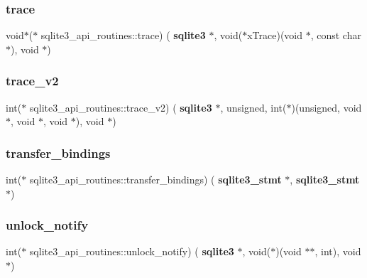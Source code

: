 \subsubsection{trace}
{\footnotesize\ttfamily void$\ast$($\ast$ sqlite3\+\_\+api\+\_\+routines\+::trace) (\textbf{ sqlite3} $\ast$, void($\ast$x\+Trace)(void $\ast$, const char $\ast$), void $\ast$)}

\mbox{\label{structsqlite3__api__routines_a1e15157983af5536336892fdc5707275}} 
\subsubsection{trace\_v2}
{\footnotesize\ttfamily int($\ast$ sqlite3\+\_\+api\+\_\+routines\+::trace\+\_\+v2) (\textbf{ sqlite3} $\ast$, unsigned, int($\ast$)(unsigned, void $\ast$, void $\ast$, void $\ast$), void $\ast$)}

\mbox{\label{structsqlite3__api__routines_ab3c5b0d61682151cd3c8419eb4c1ca13}} 
\subsubsection{transfer\_bindings}
{\footnotesize\ttfamily int($\ast$ sqlite3\+\_\+api\+\_\+routines\+::transfer\+\_\+bindings) (\textbf{ sqlite3\+\_\+stmt} $\ast$, \textbf{ sqlite3\+\_\+stmt} $\ast$)}

\mbox{\label{structsqlite3__api__routines_a600f476bdaff1340fa4fa6255e4f0394}} 
\subsubsection{unlock\_notify}
{\footnotesize\ttfamily int($\ast$ sqlite3\+\_\+api\+\_\+routines\+::unlock\+\_\+notify) (\textbf{ sqlite3} $\ast$, void($\ast$)(void $\ast$$\ast$, int), void $\ast$)}

\mbox{\label{structsqlite3__api__routines_a85cffd9c5f77524f9b74292994b4b205}} 
